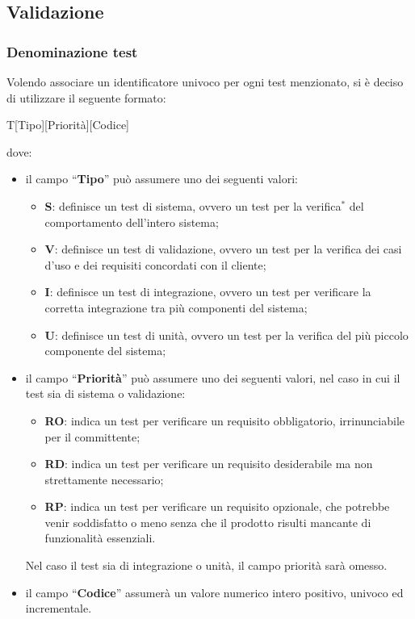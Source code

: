 \documentclass[11pt,a4paper]{article}
\begin{document}
{	\subsection{Validazione}
	\subsubsection{Denominazione test}
	Volendo associare un identificatore univoco per ogni test menzionato, si \`e deciso di utilizzare il seguente formato:
	\begin{center}
		T[Tipo][Priorità][Codice]
	\end{center}
	dove:
	\begin{itemize}
		\item il campo “\textbf{Tipo}” può assumere uno dei seguenti valori:
		\begin{itemize}
			\item \textbf{S}: definisce un test di sistema, ovvero un test per la verifica$^*$ del comportamento dell'intero sistema;
			\item \textbf{V}: definisce un test di validazione, ovvero un test per la verifica dei casi d'uso e dei requisiti concordati con il cliente;
			\item \textbf{I}: definisce un test di integrazione, ovvero un test per verificare la corretta integrazione tra più componenti del sistema;
			\item \textbf{U}: definisce un test di unità, ovvero un test per la verifica del più piccolo componente del sistema;
		\end{itemize}
		\item il campo “\textbf{Priorità}” può assumere uno dei seguenti valori, nel caso in cui il test sia di sistema o validazione:
			\begin{itemize}
				\item \textbf{RO}: indica un test per verificare un requisito obbligatorio, irrinunciabile per il committente;
				\item \textbf{RD}: indica un test per verificare un requisito desiderabile ma non strettamente necessario;
				\item \textbf{RP}: indica un test per verificare un requisito opzionale, che potrebbe venir soddisfatto o meno senza che il prodotto risulti mancante di funzionalità essenziali.
			\end{itemize}
			Nel caso il test sia di integrazione o unità, il campo priorità sarà omesso.
		\item il campo “\textbf{Codice}” assumerà un valore numerico intero positivo, univoco ed incrementale.
	\end{itemize}
	
}
\end{document}
